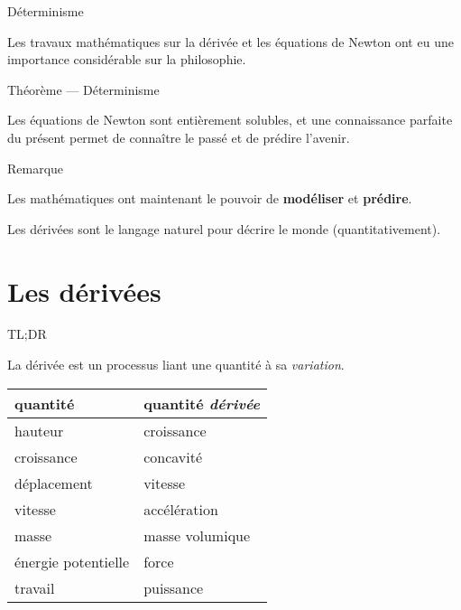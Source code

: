 \documentclass{beamer}
\begin{document}
\begin{frame}
    {Déterminisme}

    Les travaux mathématiques sur la dérivée et les équations de Newton
    ont eu une importance considérable sur la philosophie.
    \begin{exampleblock}
        {Théorème --- Déterminisme}

        Les équations de Newton sont entièrement solubles,
        et une connaissance parfaite du présent permet de connaître le passé et de prédire l'avenir.
    \end{exampleblock}
\end{frame}

\begin{frame}
    {Remarque}

    Les mathématiques ont maintenant le pouvoir de \textbf{modéliser} et \textbf{prédire}.
    \pause{}

    Les dérivées sont le langage naturel pour décrire le monde (quantitativement).
\end{frame}

\section{Les dérivées}

\begin{frame}
    {TL;DR}

    La dérivée est un processus liant une quantité à sa \emph{variation}.
    \pause{}

    \begin{center}
        \begin{tabular}
            {|l|l|}

            \toprule
            quantité & quantité \emph{dérivée}\\
            \midrule

            hauteur & croissance\\
            croissance & concavité\\
            déplacement & vitesse\\
            vitesse & accélération\\
            masse & masse volumique\\
            énergie potentielle & force\\
            travail & puissance\\
            \bottomrule
        \end{tabular}
    \end{center}
\end{frame}
\end{document}
